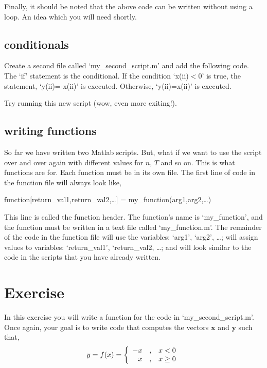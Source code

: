 \documentclass[letter]{article}
\begin{document}
Finally, it should be noted that the above code can be written without
using a loop.  An idea which you will need shortly.

\subsection*{conditionals}
Create a second file called `my\_second\_script.m' and add the
following code.  The `if' statement is the conditional.  If the
condition `x(ii)$<$0' is true, the statement, `y(ii)=-x(ii)' is
executed.  Otherwise, `y(ii)=x(ii)' is executed.



Try running this new script (wow, even more exiting!).

\subsection*{writing functions}
So far we have written two Matlab scripts.  But, what if we want to
use the script over and over again with different values for $n$, $T$
and so on.  This is what functions are for.  Each function must be in
its own file.  The first line of code in the function file will always
look like,\\

\centerline{function[return\_val1,return\_val2,\ldots] =
my\_function(arg1,arg2,\ldots)}\vspace{.5cm}

This line is called the function header. The function's name is
`my\_function', and the function must be written in a text
file called `my\_function.m'.  The remainder of the code in the
function file will use the variables: `arg1', `arg2', \ldots; will
assign values to variables: `return\_val1', `return\_val2, \ldots; and
will look similar to the code in the scripts that you have already written.

\section*{Exercise}
In this exercise you will write a function for the code in
`my\_second\_script.m'.  Once again, your goal is to write code that
computes the vectors $\mathbf{x}$ and $\mathbf{y}$ such that,
\begin{equation}
  y=f(x)=
  \left\{
  \begin{array}{r@{\quad,\quad}l}
    -x & x < 0\\
    x  & x \geq 0
  \end{array}
  \right.
  \label{eqn:saw}
\end{equation}
\end{document}
